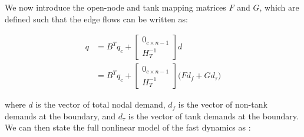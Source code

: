 

We now introduce the open-node and tank mapping matrices ${F}$ and ${G}$, which are defined such that the edge flows can be written as:

\begin{equation}\label{eq:FlowDecomposition}
	\begin{split}
		q &=	B^T q_c + \begin{bmatrix}0_{c \times n-1} \\ {H}_T^{-1} \end{bmatrix} {d} \\
		 &= B^T q_c +	\begin{bmatrix} 0_{c \times n-1} \\ {H}_T^{-1} \end{bmatrix}\Big({F}d_f + {G}d_\tau \Big)
	\end{split}
\end{equation}

where $d$ is the vector of total nodal demand, $d_f$ is the vector of non-tank demands at the boundary, and $d_\tau$ is the vector of tank demands at the boundary. We can then state the full nonlinear model of the fast dynamics as \cite{Rathore1030,Jensen}:




